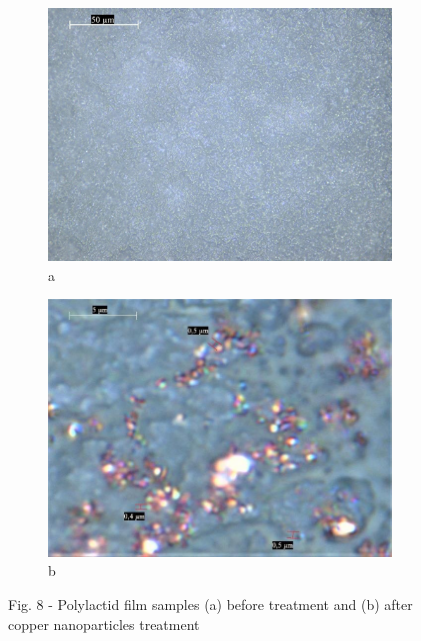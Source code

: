 \begin{figure}[H]
    \centering
    \begin{subfigure}[b]{0.45\textwidth}
        \centering
        \includegraphics[width=\textwidth]{assets/21}
        \caption*{a}
    \end{subfigure}
    \hfill
    \begin{subfigure}[b]{0.45\textwidth}
        \centering
        \includegraphics[width=\textwidth]{assets/22}
        \caption*{b}
    \end{subfigure}
    \caption*{Fig. 8 - Polylactid film samples (a) before treatment and (b) after copper nanoparticles treatment}
\end{figure}

